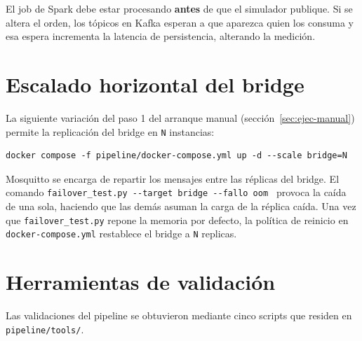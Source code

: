 El job de Spark debe estar procesando \textbf{antes} de que el simulador publique. Si se altera el orden, los tópicos en Kafka esperan a que aparezca quien los consuma y esa espera incrementa la latencia de persistencia, alterando la medición.

\section{Escalado horizontal del bridge}

La siguiente variación del paso 1 del arranque manual (sección~\ref{sec:ejec-manual}) permite la replicación del bridge en \texttt{N} instancias:

{\footnotesize
\begin{verbatim}
docker compose -f pipeline/docker-compose.yml up -d --scale bridge=N
\end{verbatim}
}

Mosquitto se encarga de repartir los mensajes entre las réplicas del bridge. El comando \texttt{failover\_test.py -{}-target bridge -{}-fallo oom } provoca la caída de una sola, haciendo que las demás asuman la carga de la réplica caída. Una vez que \texttt{failover\_test.py} repone la memoria por defecto, la política de reinicio en \texttt{docker-compose.yml} restablece el bridge a \texttt{N} replicas.

\section{Herramientas de validación}
\label{sec:ejec-herramientas}

Las validaciones del pipeline se obtuvieron mediante cinco scripts que residen en \texttt{pipeline/tools/}.

